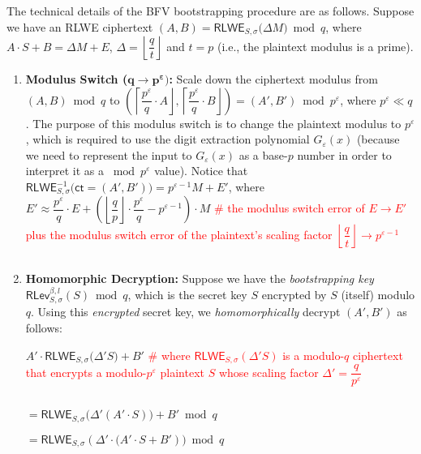 $ $

The technical details of the BFV bootstrapping procedure are as follows. Suppose we have an RLWE ciphertext $(A, B)  = \textsf{RLWE}_{S, \sigma}\bm(\Delta M\bm) \bmod q$, where $A\cdot S + B = \Delta M + E$, \text{ } $\Delta = \left\lfloor\dfrac{q}{t}\right\rfloor$ and $t = p$ (i.e., the plaintext modulus is a prime).

\begin{enumerate}
\item \textbf{Modulus Switch ($\bm{q \rightarrow p^\varepsilon})$:} Scale down the ciphertext modulus from $(A, B) \bmod q$ to $\left(\left\lceil \dfrac{p^\varepsilon}{q}\cdot A\right\rfloor, \left\lceil \dfrac{p^\varepsilon}{q}\cdot B\right\rfloor\right) = (A', B') \bmod p^\varepsilon$, where $p^\varepsilon \ll q$. The purpose of this modulus switch is to change the plaintext modulus to $p^\varepsilon$, which is required to use the digit extraction polynomial $G_\varepsilon(x)$ (because we need to represent the input to $G_\varepsilon(x)$ as a base-$p$ number in order to interpret it as a $\bmod p^\varepsilon$ value). Notice that $\textsf{RLWE}_{S, \sigma}^{-1}\bm(\textsf{ct} = (A', B') \bm) = p^{\varepsilon-1}M + E'$, where $E' \approx \dfrac{p^\varepsilon}{q}\cdot E  + \left(\left\lfloor\dfrac{q}{p}\right\rfloor\cdot\dfrac{p^\varepsilon}{q} - p^{\varepsilon-1}\right)\cdot M$ \textcolor{red}{ \# the modulus switch error of $E \rightarrow E'$ plus the modulus switch error of the plaintext's scaling factor $\left\lfloor\dfrac{q}{t}\right\rfloor \rightarrow p^{\varepsilon-1}$}

$ $

\item \textbf{Homomorphic Decryption:} Suppose we have the \textit{bootstrapping key} $\textsf{RLev}_{S, \sigma}^{\beta, l}(S) \bmod q$, which is the secret key $S$ encrypted by $S$ (itself) modulo $q$. Using this \textit{encrypted} secret key, we \textit{homomorphically} decrypt $(A', B')$ as follows:

$A' \cdot \textsf{RLWE}_{S, \sigma}\bm(\Delta' S\bm) + B'$ \textcolor{red}{ \# where $\textsf{RLWE}_{S, \sigma}(\Delta' S)$ is a modulo-$q$ ciphertext that encrypts a modulo-$p^\varepsilon$ plaintext $S$ whose scaling factor $\Delta' = \dfrac{q}{p^\varepsilon}$ }

$ $

$= \textsf{RLWE}_{S, \sigma}\bm(\Delta' (A' \cdot S)\bm) + B'  \bmod q$

$= \textsf{RLWE}_{S, \sigma}(\Delta' \cdot \bm(A'\cdot S + B')\bm) \bmod q$


\end{enumerate}

